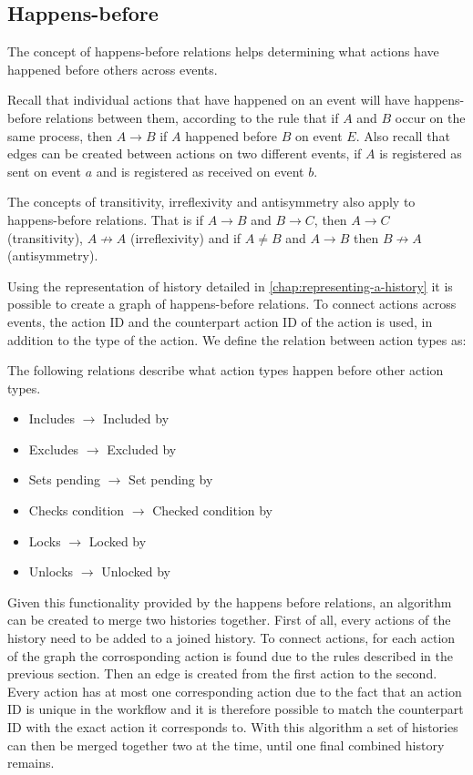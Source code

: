 	\subsection{Happens-before}
	The concept of happens-before relations helps determining what actions have happened before others across events.
	
	Recall that individual actions that have happened on an event will have happens-before relations between them, according to the rule that if $A$ and $B$ occur on the same process, then $A \rightarrow B$ if $A$ happened before $B$ on event $E$.
	Also recall that edges can be created between actions on two different events, if $A$ is registered as sent on event $a$ and is registered as received on event $b$.
	
	The concepts of transitivity, irreflexivity and antisymmetry also apply to happens-before relations. That is if $A \rightarrow B$ and $B \rightarrow C$, then $A \rightarrow C$ (transitivity), $A \not\rightarrow A$ (irreflexivity) and if $A \neq B$ and $A \rightarrow B$ then $B \not\rightarrow A$ (antisymmetry).
	
	\newpar Using the representation of history detailed in \autoref{chap:representing-a-history} it is possible to create a graph of happens-before relations. To connect actions across events, the action ID and the counterpart action ID of the action is used, in addition to the type of the action. We define the relation between action types as:
	
	\begin{definition}
		The following relations describe what action types happen before other action types.
			\begin{itemize}
				\item Includes $\rightarrow$ Included by
				\item Excludes $\rightarrow$ Excluded by
				\item Sets pending $\rightarrow$ Set pending by
				\item Checks condition $\rightarrow$ Checked condition by
				\item Locks $\rightarrow$ Locked by
				\item Unlocks $\rightarrow$ Unlocked by
			\end{itemize}
	\end{definition}
	
	Given this functionality provided by the happens before relations, an algorithm can be created to merge two histories together. First of all, every actions of the history need to be added to a joined history. To connect actions, for each action of the graph the corrosponding action is found due to the rules described in the previous section. Then an edge is created from the first action to the second. Every action has at most one corresponding action due to the fact that an action ID is unique in the workflow and it is therefore possible to match the counterpart ID with the exact action it corresponds to. With this algorithm a set of histories can then be merged together two at the time, until one final combined history remains.
	
